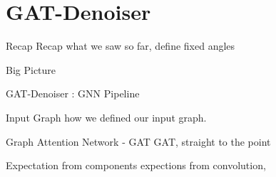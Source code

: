 
\section{GAT-Denoiser}

\begin{frame}{Recap}
  Recap what we saw so far, define fixed angles
\end{frame}

\begin{frame}{Big Picture}

  GAT-Denoiser : GNN
  Pipeline
\end{frame}

\begin{frame}{Input Graph}
  how we defined our input graph.
\end{frame}

\begin{frame}{Graph Attention Network - GAT}
  GAT, straight to the point
\end{frame}

\begin{frame}{Expectation from components}
  expections from convolution,   
\end{frame}

